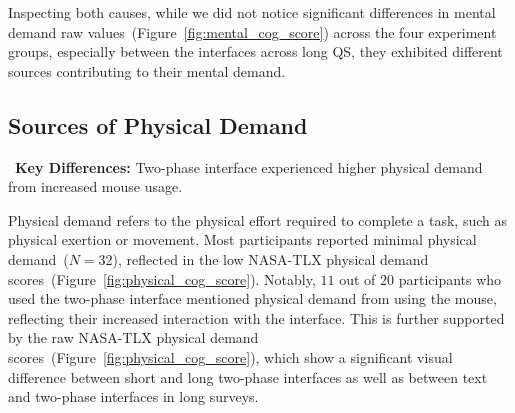 Inspecting both causes, while we did not notice significant differences in mental demand raw values~(Figure~\ref{fig:mental_cog_score}) across the four experiment groups, especially between the interfaces across long QS, they exhibited different sources contributing to their mental demand.



\subsection{Sources of Physical Demand} 
\label{sec:physical}

\begin{tldrbox}
   \faKey~\textbf{Key Differences:} Two-phase interface experienced higher physical demand from increased mouse usage.
\end{tldrbox}


Physical demand refers to the physical effort required to complete a task, such as physical exertion or movement. Most participants reported minimal physical demand~($N=32$), reflected in the low NASA-TLX physical demand scores~(Figure~\ref{fig:physical_cog_score}). Notably, $11$ out of $20$ participants who used the two-phase interface mentioned physical demand from using the mouse, reflecting their increased interaction with the interface. This is further supported by the raw NASA-TLX physical demand scores~(Figure~\ref{fig:physical_cog_score}), which show a significant visual difference between short and long two-phase interfaces as well as between text and two-phase interfaces in long surveys.


